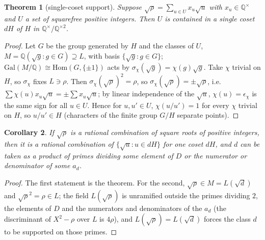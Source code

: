 \documentclass[11pt,oneside]{article}
\numberwithin{equation}{section}
\newtheorem{theorem}{Theorem}[section]
\newtheorem{corollary}[theorem]{Corollary}
\theoremstyle{definition}
\theoremstyle{remark}
\newcommand{\Q}{\mathbb{Q}}
\begin{document}
\begin{theorem}[single-coset support]\label{thm:coset}
Suppose $\sqrt\rho=\sum_{u\in U}x_u\sqrt u$ with $x_u\in\Q^\times$ and $U$ a set of squarefree positive integers. Then $U$ is contained in a single coset $dH$ of $H$ in $\Q^\times/\Q^{\times2}$.
\end{theorem}
\begin{proof}
Let $G$ be the group generated by $H$ and the classes of $U$, $M=\Q(\sqrt g:g\in G)\supseteq L$, with basis $\{\sqrt g:g\in G\}$; $\mathrm{Gal}(M/\Q)\cong\mathrm{Hom}(G,\{\pm1\})$ acts by $\sigma_\chi(\sqrt g)=\chi(g)\sqrt g$. Take $\chi$ trivial on $H$, so $\sigma_\chi$ fixes $L\ni\rho$. Then $\sigma_\chi(\sqrt\rho)^2=\rho$, so $\sigma_\chi(\sqrt\rho)=\pm\sqrt\rho$, i.e. $\sum\chi(u)x_u\sqrt u=\pm\sum x_u\sqrt u$; by linear independence of the $\sqrt u$, $\chi(u)=\epsilon_\chi$ is the same sign for all $u\in U$. Hence for $u,u'\in U$, $\chi(u/u')=1$ for every $\chi$ trivial on $H$, so $u/u'\in H$ (characters of the finite group $G/H$ separate points).
\end{proof}

\begin{corollary}
If $\sqrt\rho$ is a rational combination of square roots of positive integers, then it is a rational combination of $\{\sqrt u:u\in dH\}$ for one coset $dH$, and $d$ can be taken as a product of primes dividing some element of $D$ or the numerator or denominator of some $a_d$.
\end{corollary}
\begin{proof}
The first statement is the theorem. For the second, $\sqrt\rho\in M=L(\sqrt d)$ and $\sqrt\rho^2=\rho\in L$; the field $L(\sqrt\rho)$ is unramified outside the primes dividing $2$, the elements of $D$ and the numerators and denominators of the $a_d$ (the discriminant of $X^2-\rho$ over $L$ is $4\rho$), and $L(\sqrt\rho)=L(\sqrt d)$ forces the class $d$ to be supported on those primes.
\end{proof}
\end{document}
